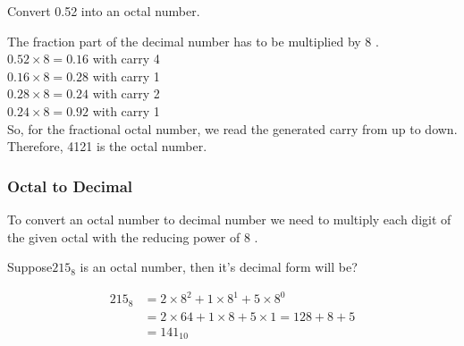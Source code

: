 \begin{exercise}
	Convert 0.52 into an octal number.
\end{exercise}
\begin{answer}
	The fraction part of the decimal number has to be multiplied by 8 .\\
	$0.52 \times 8=0.16$ with carry 4\\
	$0.16 \times 8=0.28$ with carry 1\\
	$0.28 \times 8=0.24$ with carry 2\\
	$0.24 \times 8=0.92$ with carry 1\\
	So, for the fractional octal number, we read the generated carry from up to down.
	Therefore, 4121 is the octal number.	
\end{answer}
\subsubsection{Octal to Decimal}
To convert an octal number to decimal number we need to multiply each digit of the given octal with the reducing power of 8 .
\begin{exercise}
	Suppose$215_{8}$ is an octal number, then it's decimal form will be?
\end{exercise}
\begin{answer}
	$$
	\begin{aligned}
	215_{8} &=2 \times 8^{2}+1 \times 8^{1}+5 \times 8^{0} \\
	&=2 \times 64+1 \times 8+5 \times 1=128+8+5 \\
	&=141_{10}
	\end{aligned}
	$$	
\end{answer}
